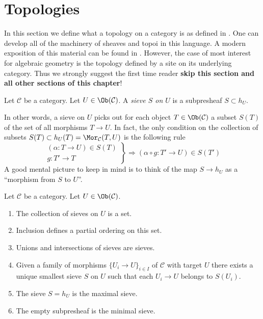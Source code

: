 \section{Topologies}
\label{section-topologies}

\noindent
In this section we define what a topology on a category is as
defined in \cite{SGA4}. One can develop all of the machinery of
sheaves and topoi in this language. A modern exposition of this material
can be found in \cite{KS}. However, the case of most interest for algebraic
geometry is the topology defined by a site on its underlying category.
Thus we strongly suggest the first time reader
{\bf skip this section and all other sections of this chapter}!

\begin{definition}
\label{definition-sieve}
Let $\mathcal{C}$ be a category. Let $U \in \Ob(\mathcal{C})$.
A {\it sieve $S$ on $U$} is a subpresheaf $S \subset h_U$.
\end{definition}

\noindent
In other words, a sieve on $U$ picks out for each object
$T \in \Ob(\mathcal{C})$ a subset $S(T)$ of the set
of all morphisms $T \to U$. In fact, the only condition
on the collection of subsets
$S(T) \subset h_U(T) = \Mor_\mathcal{C}(T, U)$
is the following rule
\begin{equation}
\label{equation-property-sieve}
\left.
\begin{matrix}
(\alpha : T \to U) \in S(T) \\
g : T' \to T
\end{matrix}
\right\} \Rightarrow
(\alpha \circ g : T' \to U) \in S(T')
\end{equation}
A good mental picture to keep in mind is to think of the
map $S \to h_U$ as a ``morphism from $S$ to $U$''.

\begin{lemma}
\label{lemma-sieves-set}
Let $\mathcal{C}$ be a category. Let $U \in \Ob(\mathcal{C})$.
\begin{enumerate}
\item The collection of sieves on $U$ is a set.
\item Inclusion defines a partial ordering on this set.
\item Unions and intersections of sieves are sieves.
\item
\label{item-sieve-generated}
Given a family of morphisms $\{U_i \to U\}_{i\in I}$
of $\mathcal{C}$ with target $U$
there exists a unique smallest sieve $S$ on $U$ such that
each $U_i \to U$ belongs to $S(U_i)$.
\item The sieve $S = h_U$ is the maximal sieve.
\item The empty subpresheaf is the minimal sieve.
\end{enumerate}
\end{lemma}

